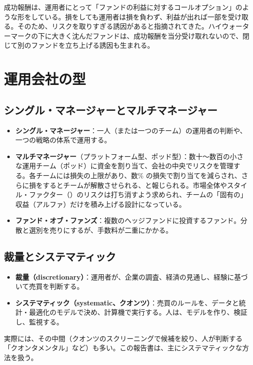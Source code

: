成功報酬は、運用者にとって「ファンドの利益に対するコールオプション」のような形をしている。損をしても運用者は損を負わず、利益が出れば一部を受け取る。そのため、リスクを取りすぎる誘因があると指摘されてきた。ハイウォーターマークの下に大きく沈んだファンドは、成功報酬を当分受け取れないので、閉じて別のファンドを立ち上げる誘因も生まれる。

\section{運用会社の型}

\subsection{シングル・マネージャーとマルチマネージャー}

\begin{itemize}
\item \textbf{シングル・マネージャー}：一人（または一つのチーム）の運用者の判断や、一つの戦略の体系で運用する。
\item \textbf{マルチマネージャー}（プラットフォーム型、ポッド型）：数十〜数百の小さな運用チーム（ポッド）に資金を割り当て、会社の中央でリスクを管理する。各チームには損失の上限があり、数\% の損失で割り当てを減らされ、さらに損をするとチームが解散させられる、と報じられる。市場全体やスタイル・ファクター（）のリスクは打ち消すよう求められ、チームの「固有の」収益（アルファ）だけを積み上げる設計になっている。
\item \textbf{ファンド・オブ・ファンズ}：複数のヘッジファンドに投資するファンド。分散と選別を売りにするが、手数料が二重にかかる。
\end{itemize}

\subsection{裁量とシステマティック}

\begin{itemize}
\item \textbf{裁量（discretionary）}：運用者が、企業の調査、経済の見通し、経験に基づいて売買を判断する。
\item \textbf{システマティック（systematic、クオンツ）}：売買のルールを、データと統計・最適化のモデルで決め、計算機で実行する。人は、モデルを作り、検証し、監視する。
\end{itemize}

実際には、その中間（クオンツのスクリーニングで候補を絞り、人が判断する「クオンタメンタル」など）も多い。この報告書は、主にシステマティックな方法を扱う。

